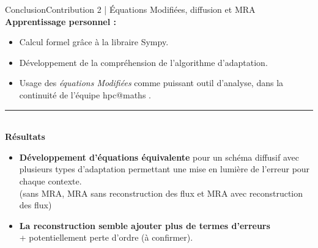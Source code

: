 \begin{frame}{Conclusion}{Contribution 2 | Équations Modifiées, diffusion et MRA}
    \textbf{Apprentissage personnel : }\\
    \begin{itemize}
        \item Calcul formel grâce à la libraire Sympy.
        \item Développement de la compréhension de l'algorithme d'adaptation.
        \item Usage des \emph{équations Modifiées} comme puissant outil d'analyse, dans la continuité de l'équipe hpc@maths \cite{Massot2025_meshAdaptation,belloti_et_al_2025}.
    \end{itemize}
    \noindent\color{Primary}\rule{\linewidth}{0.6pt}\color{black}\\
    \textbf{Résultats}\\
        \begin{itemize}
            \item \textbf{Développement d'équations équivalente} pour un schéma diffusif avec plusieurs types d'adaptation
            permettant une mise en lumière de l'erreur pour chaque contexte.\\
            \scriptsize{(sans MRA, MRA sans reconstruction des flux et MRA avec reconstruction des flux)}
            \item \textbf{La reconstruction semble ajouter plus de termes d'erreurs}\\\scriptsize{+ potentiellement perte d'ordre (à confirmer).}
        \end{itemize}
\end{frame}